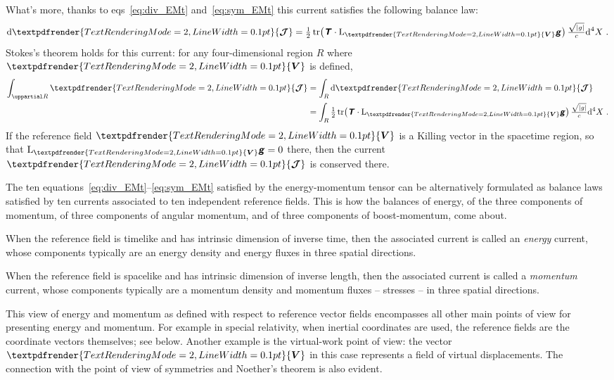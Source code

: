 \documentclass[\ifafour a4paper,12pt,\else a5paper,10pt,\fi%
onecolumn,oneside,article,%
british%
]{memoir}
\newcommand*{\mathte}[1]{\textbf{\textit{\textsf{#1}}}}
\renewcommand*{\bm}[1]{\textpdfrender{TextRenderingMode=2,LineWidth=0.1pt}{\boldsymbol{#1}}}
\newcommand*{\de}{\uppartial}%
\newcommand*{\di}{\mathrm{d}}%
\newcommand*{\Li}{\mathrm{L}}%
\DeclareMathOperator{\tr}{tr}%
\DeclarePairedDelimiter\abs{\lvert}{\rvert}
\renewcommand*{\|}[1][]{\nonscript\:#1\vert\nonscript\:\mathopen{}}
\newcommand*{\sect}{\S}%
\newcommand*{\eqns}{eqs}%
\newcommand*{\tttti}[1]{\di^{4}X_{#1}}
\newcommand*{\yg}{\mathte{g}}
\newcommand*{\dg}{\sqrt{\abs{g}}}
\newcommand*{\yTTe}{\mathte{T}}
\newcommand*{\yJJ}{\bm{\mathcal{J}}}
\newcommand*{\yV}{\bm{V}}
\begin{document}
What's more, thanks to \eqns~\eqref{eq:div_EMt} and~\eqref{eq:sym_EMt} this current satisfies the following balance law: \autocites[\sect~III.7.III \eqns~(5), (6)]{choquetbruhatetal1989_r2000}
\begin{equation}
  \label{eq:balance_V}
  \di\yJJ =
  \tfrac12 \tr\bigl(\yTTe \cdot \Li_{\yV}\yg \bigr)
  \,\tfrac{\dg}{c} \tttti{} \ .
\end{equation}
Stokes's theorem holds for this current: for any four-dimensional region $R$ where $\yV$ is defined,
\begin{equation}
  \label{eq:Stokes_V}
  \begin{aligned}
    \int_{\de R} \yJJ &= \int_{R} \di\yJJ
    \\
    &=  \int_{R}\tfrac12 \tr\bigl(\yTTe \cdot \Li_{\yV}\yg \bigr)
  \,\tfrac{\dg}{c} \tttti{} \ .
  \end{aligned}
\end{equation}
If the reference field $\yV$ is a Killing vector in the spacetime region, so that $\Li_{\yV}\yg = 0$ there, then the current $\yJJ$ is conserved there.

The ten equations~\eqref{eq:div_EMt}--\eqref{eq:sym_EMt} satisfied by the energy-momentum tensor can be alternatively formulated as balance laws satisfied by ten currents associated to ten independent reference fields. This is how the balances of energy, of the three components of  momentum, of three components of angular momentum, and of three components of boost-momentum, come about.

When the reference field is timelike and has intrinsic dimension of inverse time, then the associated current is called an \emph{energy} current, whose components typically are an energy density and  energy fluxes in three spatial directions.

When the reference field is spacelike and has intrinsic dimension of inverse length, then the associated current is called a \emph{momentum} current, whose components typically are a momentum density and momentum fluxes -- stresses -- in three spatial directions.

This view of energy and momentum as defined with respect to reference vector fields encompasses all other main points of view for presenting energy and momentum. For example in special relativity, when inertial coordinates are used, the reference fields are the coordinate vectors themselves; see below. Another example is the virtual-work point of view: the vector $\yV$ in this case represents a field of virtual displacements. The connection with the point of view of symmetries and Noether's theorem is also evident.
\end{document}
